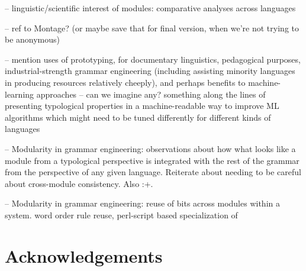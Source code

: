 \documentclass[11pt]{article}
\begin{document}
-- linguistic/scientific interest of modules: comparative analyses
across languages

-- ref to Montage? (or maybe save that for final version, when 
we're not trying to be anonymous)

-- mention uses of prototyping, for documentary linguistics, pedagogical
purposes, industrial-strength grammar engineering (including assisting
minority languages in producing resources relatively cheeply), and perhaps
benefits to machine-learning approaches -- can we imagine any?  something
along the lines of presenting typological properties in a machine-readable
way to improve ML algorithms which might need to be tuned differently for
different kinds of languages

-- Modularity in grammar engineering: observations about how what looks
like a module from a typological perspective is integrated with the rest
of the grammar from the perspective of any given language. Reiterate about
needing to be careful about cross-module consistency. Also :+.

-- Modularity in grammar engineering: reuse of bits across modules within
a system.  word order rule reuse, perl-script based specialization of 


\section*{Acknowledgements}



%

\end{document}
